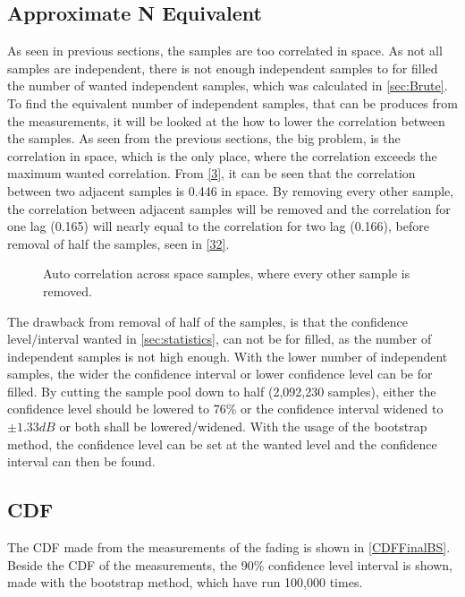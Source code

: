 \subsection{Approximate N Equivalent}


As seen in previous sections, the samples are too correlated in space. As not all samples are independent, there is not enough independent samples to for filled the number of wanted independent samples, which was calculated in \autoref{sec:Brute}. To find the equivalent number of independent samples, that can be produces from the measurements, it will be looked at the how to lower the correlation between the samples. As seen from the previous sections, the big problem, is the correlation in space, which is the only place, where the correlation exceeds the maximum wanted correlation. From \autoref{3}, it can be seen that the correlation between two adjacent samples is 0.446 in space. By removing every other sample, the correlation between adjacent samples will be removed and the correlation for one lag (0.165) will nearly equal to the correlation for two lag (0.166), before removal of half the samples, seen in \autoref{32}.


\begin{figure}[H]
\begin{center}

\caption{Auto correlation across space samples, where every other sample is removed.}
\label{32}
\end{center}
\end{figure}

The drawback from removal of half of the samples, is that the confidence level/interval wanted in \autoref{sec:statistics}, can not be for filled, as the number of independent samples is not high enough. With the lower number of independent samples, the wider the confidence interval or lower confidence level can be for filled. By cutting the sample pool down to half (2,092,230 samples), either the confidence level should be lowered to 76\% or the confidence interval widened to $\pm 1.33dB$ or both shall be lowered/widened. With the usage of the bootstrap method, the confidence level can be set at the wanted level and the confidence interval can then be found.


\subsection{CDF}
The CDF made from the measurements of the fading is shown in \autoref{CDFFinalBS}. Beside the CDF of the measurements, the 90\% confidence level interval is shown, made with the bootstrap method, which have run 100,000 times.

